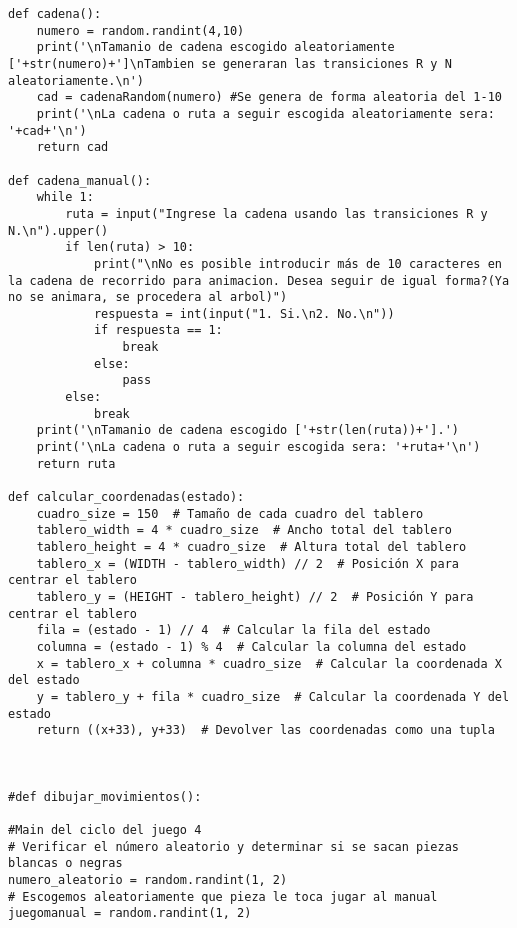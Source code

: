 \begin{lstlisting}
def cadena():
    numero = random.randint(4,10)
    print('\nTamanio de cadena escogido aleatoriamente ['+str(numero)+']\nTambien se generaran las transiciones R y N aleatoriamente.\n')
    cad = cadenaRandom(numero) #Se genera de forma aleatoria del 1-10
    print('\nLa cadena o ruta a seguir escogida aleatoriamente sera: '+cad+'\n')
    return cad

def cadena_manual():
    while 1:
        ruta = input("Ingrese la cadena usando las transiciones R y N.\n").upper()
        if len(ruta) > 10:
            print("\nNo es posible introducir más de 10 caracteres en la cadena de recorrido para animacion. Desea seguir de igual forma?(Ya no se animara, se procedera al arbol)")
            respuesta = int(input("1. Si.\n2. No.\n"))
            if respuesta == 1:
                break
            else:
                pass
        else:
            break
    print('\nTamanio de cadena escogido ['+str(len(ruta))+'].')
    print('\nLa cadena o ruta a seguir escogida sera: '+ruta+'\n')
    return ruta

def calcular_coordenadas(estado):
    cuadro_size = 150  # Tamaño de cada cuadro del tablero
    tablero_width = 4 * cuadro_size  # Ancho total del tablero
    tablero_height = 4 * cuadro_size  # Altura total del tablero
    tablero_x = (WIDTH - tablero_width) // 2  # Posición X para centrar el tablero
    tablero_y = (HEIGHT - tablero_height) // 2  # Posición Y para centrar el tablero
    fila = (estado - 1) // 4  # Calcular la fila del estado
    columna = (estado - 1) % 4  # Calcular la columna del estado
    x = tablero_x + columna * cuadro_size  # Calcular la coordenada X del estado
    y = tablero_y + fila * cuadro_size  # Calcular la coordenada Y del estado
    return ((x+33), y+33)  # Devolver las coordenadas como una tupla



#def dibujar_movimientos():

#Main del ciclo del juego 4
# Verificar el número aleatorio y determinar si se sacan piezas blancas o negras
numero_aleatorio = random.randint(1, 2)
# Escogemos aleatoriamente que pieza le toca jugar al manual
juegomanual = random.randint(1, 2)


\end{lstlisting}
